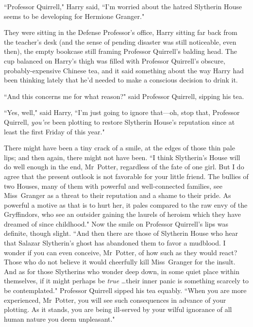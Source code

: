 \later

``Professor Quirrell," Harry said, ``I'm worried about the hatred Slytherin House seems to be developing for Hermione Granger."

They were sitting in the Defense Professor's office, Harry sitting far back from the teacher's desk (and the sense of pending disaster was still noticeable, even then), the empty bookcase still framing Professor Quirrell's balding head. The cup balanced on Harry's thigh was filled with Professor Quirrell's obscure, probably-expensive Chinese tea, and it said something about the way Harry had been thinking lately that he'd needed to make a conscious decision to drink it.

``And this concerns me for what reason?" said Professor Quirrell, sipping his tea.

``Yes, well," said Harry, ``I'm just going to ignore that—oh, stop that, Professor Quirrell, \emph{you've} been plotting to restore Slytherin House's reputation since at least the first Friday of this year."

There might have been a tiny crack of a smile, at the edges of those thin pale lips; and then again, there might not have been. ``I think Slytherin's House will do well enough in the end, Mr~Potter, regardless of the fate of one girl. But I do agree that the present outlook is not favorable for your little friend. The bullies of two Houses, many of them with powerful and well-connected families, see Miss~Granger as a threat to their reputation and a shame to their pride. As powerful a motive as that is to hurt her, it pales compared to the raw envy of the Gryffindors, who see an outsider gaining the laurels of heroism which they have dreamed of since childhood." Now the smile on Professor Quirrell's lips was definite, though slight. ``And then there are those of Slytherin House who hear that Salazar Slytherin's ghost has abandoned them to favor a mudblood. I wonder if you can even conceive, Mr~Potter, of how such as they would react? Those who do not believe it would cheerfully kill Miss~Granger for the insult. And as for those Slytherins who wonder deep down, in some quiet place within themselves, if it might perhaps be \emph{true} {\ldots}their inner panic is something scarcely to be contemplated." Professor Quirrell sipped his tea equably. ``When you are more experienced, Mr~Potter, you will see such consequences in advance of your plotting. As it stands, you are being ill-served by your wilful ignorance of all human nature you deem unpleasant."

